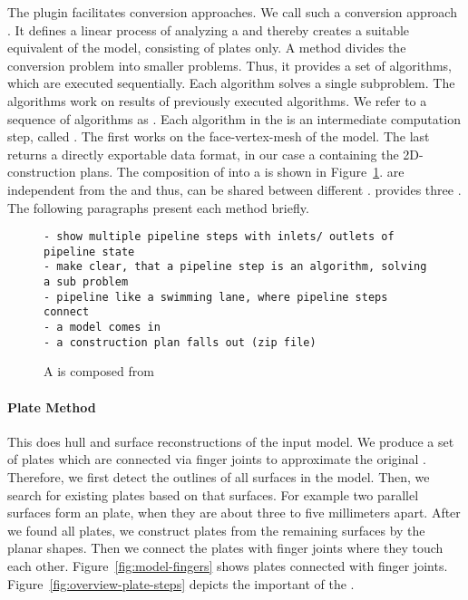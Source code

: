 \documentclass[../ClassicThesis.tex]{subfiles}
\begin{document}
The  plugin facilitates conversion
approaches. We call such a conversion approach
\class{\fabmethod}.
It defines a linear process of analyzing a {\threedmodel}
and thereby creates a suitable equivalent of the model,
consisting of plates only. A \class{\fabrication} method
divides the conversion problem into smaller problems. Thus,
it provides a set of algorithms, which are executed
sequentially. Each algorithm solves a single subproblem. The
algorithms work on results of previously executed
algorithms. We refer to a sequence of algorithms as
. Each algorithm in the  is
an intermediate computation step, called
. The first  works
on the face-vertex-mesh of the model. The last
 returns a directly exportable data
format, in our case a {\zipfile} containing the
2D-construction plans. The composition of
 into a  is shown in
Figure~\ref{fig:pipeline-from-steps}. 
are independent from the \class{\fabmethod} and thus, can be
shared between different . {\platener}
provides three . The following paragraphs
present each method briefly.

\begin{figure}[h]
\centering
\begin{verbatim}
- show multiple pipeline steps with inlets/ outlets of
pipeline state
- make clear, that a pipeline step is an algorithm, solving
a sub problem
- pipeline like a swimming lane, where pipeline steps
connect
- a model comes in
- a construction plan falls out (zip file)
\end{verbatim}
\caption{A  is composed from
  }
\label{fig:pipeline-from-steps}
\end{figure}

\paragraph{Plate Method}

This \class{\fabmethod} does hull and surface
reconstructions of the input model. We produce a set of
plates which are connected via finger joints to approximate
the original {\threedmodel}. Therefore, we first detect the
outlines of all surfaces in the model. Then, we search for
existing plates based on that surfaces. For example two
parallel surfaces form an  plate, when they
are about three to five millimeters apart. After we found
all  plates, we construct plates from the
remaining surfaces by  the planar shapes.
Then we connect the plates with finger joints where they
touch each other. Figure~\ref{fig:model-fingers} shows
plates connected with finger joints.
Figure~\ref{fig:overview-plate-steps} depicts the important
 of the .
\end{document}
